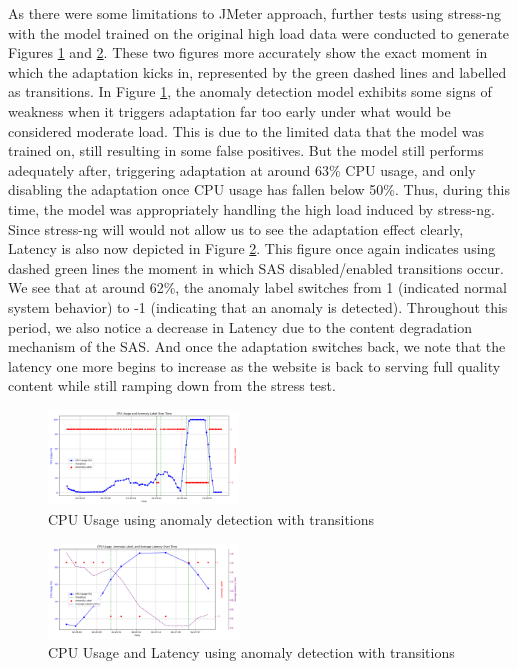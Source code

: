 \documentclass[conference]{IEEEtran}
\begin{document}
As there were some limitations to JMeter approach, further tests using stress-ng with the model trained on the original high load data were conducted to generate Figures \ref{fig:anomaly_test_CPU_with_transition} and \ref{fig:anomaly_test_CPU-Latency_with_transition}. These two figures more accurately show the exact moment in which the adaptation kicks in, represented by the green dashed lines and labelled as transitions. In Figure \ref{fig:anomaly_test_CPU_with_transition}, the anomaly detection model exhibits some signs of weakness when it triggers adaptation far too early under what would be considered moderate load. This is due to the limited data that the model was trained on, still resulting in some false positives. But the model still performs adequately after, triggering adaptation at around 63\% CPU usage, and only disabling the adaptation once CPU usage has fallen below 50\%. Thus, during this time, the model was appropriately handling the high load induced by stress-ng. Since stress-ng will would not allow us to see the adaptation effect clearly, Latency is also now depicted in Figure \ref{fig:anomaly_test_CPU-Latency_with_transition}. This figure once again indicates using dashed green lines the moment in which SAS disabled/enabled transitions occur. We see that at around 62\%, the anomaly label switches from 1 (indicated normal system behavior) to -1 (indicating that an anomaly is detected). Throughout this period, we also notice a decrease in Latency due to the content degradation mechanism of the SAS. And once the adaptation switches back, we note that the latency one more begins to increase as the website is back to serving full quality content while still ramping down from the stress test.

\begin{figure}[H]
    \centering
    \includegraphics[width=0.45\textwidth]{./media/anomaly_test_CPU_with_transition.png}
    \caption{CPU Usage using anomaly detection with transitions}
    \label{fig:anomaly_test_CPU_with_transition}
\end{figure}

\begin{figure}[H]
    \centering
    \includegraphics[width=0.45\textwidth]{./media/anomaly_test_CPU-Latency_with_transition.png}
    \caption{CPU Usage and Latency using anomaly detection with transitions}
    \label{fig:anomaly_test_CPU-Latency_with_transition}
\end{figure}
\end{document}
